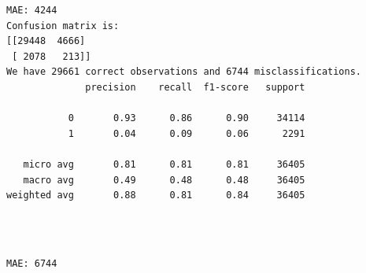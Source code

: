 \documentclass[8pt,onecolumn,aps,pra]{revtex4-1}
\begin{document}
    \begin{Verbatim}[commandchars=\\\{\}]
MAE: 4244
Confusion matrix is:
[[29448  4666]
 [ 2078   213]]
We have 29661 correct observations and 6744 misclassifications.
              precision    recall  f1-score   support

           0       0.93      0.86      0.90     34114
           1       0.04      0.09      0.06      2291

   micro avg       0.81      0.81      0.81     36405
   macro avg       0.49      0.48      0.48     36405
weighted avg       0.88      0.81      0.84     36405


    \end{Verbatim}

    \begin{center}
    \end{center}
    { \hspace*{\fill} \\}
    
    \begin{Verbatim}[commandchars=\\\{\}]
MAE: 6744

    \end{Verbatim}
\end{document}
